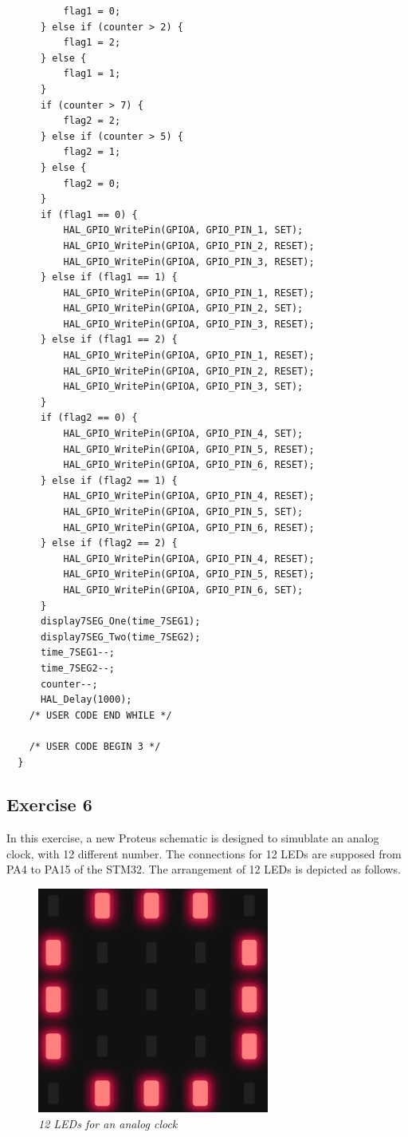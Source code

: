 \begin{lstlisting}
		  flag1 = 0;
	  } else if (counter > 2) {
		  flag1 = 2;
	  } else {
		  flag1 = 1;
	  }
	  if (counter > 7) {
		  flag2 = 2;
	  } else if (counter > 5) {
		  flag2 = 1;
	  } else {
		  flag2 = 0;
	  }
	  if (flag1 == 0) {
		  HAL_GPIO_WritePin(GPIOA, GPIO_PIN_1, SET);
		  HAL_GPIO_WritePin(GPIOA, GPIO_PIN_2, RESET);
		  HAL_GPIO_WritePin(GPIOA, GPIO_PIN_3, RESET);
	  } else if (flag1 == 1) {
		  HAL_GPIO_WritePin(GPIOA, GPIO_PIN_1, RESET);
		  HAL_GPIO_WritePin(GPIOA, GPIO_PIN_2, SET);
		  HAL_GPIO_WritePin(GPIOA, GPIO_PIN_3, RESET);
	  } else if (flag1 == 2) {
		  HAL_GPIO_WritePin(GPIOA, GPIO_PIN_1, RESET);
		  HAL_GPIO_WritePin(GPIOA, GPIO_PIN_2, RESET);
		  HAL_GPIO_WritePin(GPIOA, GPIO_PIN_3, SET);
	  }
	  if (flag2 == 0) {
		  HAL_GPIO_WritePin(GPIOA, GPIO_PIN_4, SET);
		  HAL_GPIO_WritePin(GPIOA, GPIO_PIN_5, RESET);
		  HAL_GPIO_WritePin(GPIOA, GPIO_PIN_6, RESET);
	  } else if (flag2 == 1) {
		  HAL_GPIO_WritePin(GPIOA, GPIO_PIN_4, RESET);
		  HAL_GPIO_WritePin(GPIOA, GPIO_PIN_5, SET);
		  HAL_GPIO_WritePin(GPIOA, GPIO_PIN_6, RESET);
	  } else if (flag2 == 2) {
		  HAL_GPIO_WritePin(GPIOA, GPIO_PIN_4, RESET);
		  HAL_GPIO_WritePin(GPIOA, GPIO_PIN_5, RESET);
		  HAL_GPIO_WritePin(GPIOA, GPIO_PIN_6, SET);
	  }
	  display7SEG_One(time_7SEG1);
	  display7SEG_Two(time_7SEG2);
	  time_7SEG1--;
	  time_7SEG2--;
	  counter--;
	  HAL_Delay(1000);
    /* USER CODE END WHILE */

    /* USER CODE BEGIN 3 */
  }
\end{lstlisting}

\subsection{Exercise 6}
In this exercise, a new Proteus schematic is designed to simublate an analog clock, with 12 different number. The connections for 12 LEDs are supposed from PA4 to PA15 of the STM32. The arrangement of 12 LEDs is depicted as follows.

\begin{figure}[!htp]
    \centering
    \includegraphics[width=3in]{source/picture/bai_1/pic4.PNG}
    \caption{\textit{12 LEDs for an analog clock}}
    \label{bai1_pic3}
\end{figure}

